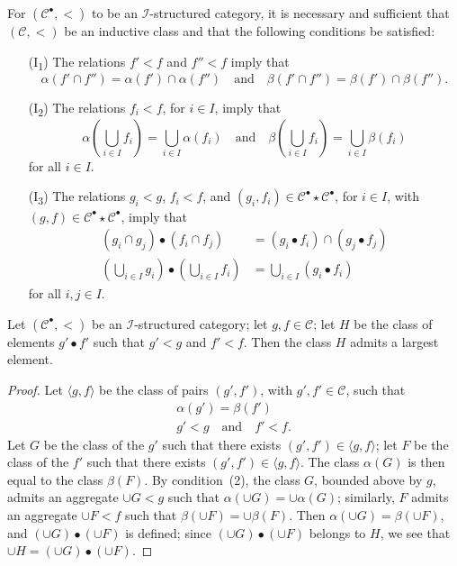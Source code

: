 \documentclass[a4paper,fleqn]{article}
\theoremstyle{plain}
\newenvironment{proposition}[1]
  {\renewcommand\theinnerproposition{#1}\innerproposition}
  {\endinnerproposition}
\theoremstyle{definition}
\newcommand{\oldpage}[1]{{\marginpar{\footnotesize$\bigg\vert$\,\,\,\,\textit{p.~#1}}}}
\newcommand{\textand}{\quad\text{and}\quad}
\newcommand{\CC}{\mathcal{C}}
\newcommand{\II}{\mathcal{I}}
\begin{document}
\oldpage{404}
For $(\CC^\bullet,<)$ to be an $\II$-structured category, it is necessary and sufficient that $(\CC,<)$ be an inductive class and that the following conditions be satisfied:
\begin{enumerate}
  \item[\normalfont(I\textsubscript{1})]
    The relations $f'<f$ and $f''<f$ imply that
    \[
      \alpha(f'\cap f'') = \alpha(f')\cap\alpha(f'')
      \textand
      \beta(f'\cap f'') = \beta(f')\cap\beta(f'').
    \]
  \item[\normalfont(I\textsubscript{2})]
    The relations $f_i<f$, for $i\in I$, imply that
    \[
      \alpha\left(\bigcup_{i\in I}f_i\right)
      = \bigcup_{i\in I}\alpha(f_i)
      \textand
      \beta\left(\bigcup_{i\in I}f_i\right)
      = \bigcup_{i\in I}\beta(f_i)
    \]
    for all $i\in I$.
  \item[\normalfont(I\textsubscript{3})]
    The relations $g_i<g$, $f_i<f$, and $(g_i,f_i)\in\CC^\bullet\star\CC^\bullet$, for $i\in I$, with $(g,f)\in\CC^\bullet\star\CC^\bullet$, imply that
    \[
      \begin{aligned}
        (g_i\cap g_j)\bullet(f_i\cap f_j)
        &= (g_i\bullet f_i)\cap(g_j\bullet f_j)
      \\\left(\bigcup_{i\in I}g_i\right)\bullet\left(\bigcup_{i\in I}f_i\right)
        &= \bigcup_{i\in I}(g_i\bullet f_i)
      \end{aligned}
    \]
    for all $i,j\in I$.
\end{enumerate}

\begin{proposition}{22}
\label{proposition:ii-22}
  Let $(\CC^\bullet,<)$ be an $\II$-structured category;
  let $g,f\in\CC$;
  let $H$ be the class of elements $g'\bullet f'$ such that $g'<g$ and $f'<f$.
  Then the class $H$ admits a largest element.
\end{proposition}

\begin{proof}
  Let $\langle{g,f}\rangle$ be the class of pairs $(g',f')$, with $g',f'\in\CC$, such that
  \[
    \begin{gathered}
      \alpha(g')=\beta(f')
    \\g'<g
      \textand
      f'<f.
    \end{gathered}
  \]
  Let $G$ be the class of the $g'$ such that there exists $(g',f')\in\langle{g,f}\rangle$;
  let $F$ be the class of the $f'$ such that there exists $(g',f')\in\langle{g,f}\rangle$.
  The class $\alpha(G)$ is then equal to the class $\beta(F)$.
  By condition~(2), the class $G$, bounded above by $g$, admits an aggregate $\cup G<g$ such that $\alpha(\cup G)=\cup\alpha(G)$;
  similarly, $F$ admits an aggregate $\cup F<f$ such that $\beta(\cup F)=\cup\beta(F)$.
  Then $\alpha(\cup G)=\beta(\cup F)$, and $(\cup G)\bullet(\cup F)$ is defined;
  since $(\cup G)\bullet(\cup F)$ belongs to $H$, we see that $\cup H=(\cup G)\bullet(\cup F)$.
\end{proof}
\end{document}
